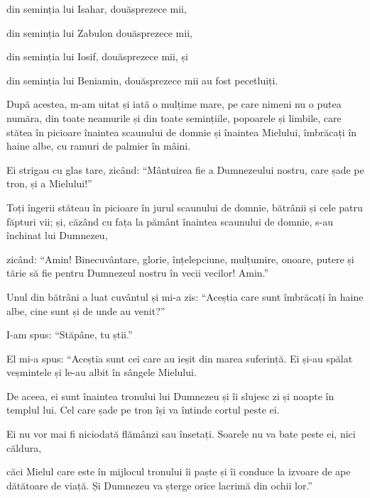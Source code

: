 {\par }{\Q din seminția lui Isahar, douăsprezece mii,


\par }{\Q {}din seminția lui Zabulon douăsprezece mii,

\par }{\Q din seminția lui Iosif, douăsprezece mii, și

\par }{\Q din seminția lui Beniamin, douăsprezece mii au fost pecetluiți.


\par }{\PP {}După acestea, m-am uitat și iată o mulțime mare, pe care nimeni nu o putea număra, din toate neamurile și din toate semințiile, popoarele și limbile, care stătea în picioare înaintea scaunului de domnie și înaintea Mielului, îmbrăcați în haine albe, cu ramuri de palmier în mâini.

Ei strigau cu glas tare, zicând: “Mântuirea fie a Dumnezeului nostru, care șade pe tron, și a Mielului!”


\par }{\PP {}Toți îngerii stăteau în picioare în jurul scaunului de domnie, bătrânii și cele patru făpturi vii; și, căzând cu fața la pământ înaintea scaunului de domnie, s-au închinat lui Dumnezeu,

zicând: “Amin! Binecuvântare, glorie, înțelepciune, mulțumire, onoare, putere și tărie să fie pentru Dumnezeul nostru în vecii vecilor! Amin.”


\par }{\PP {}Unul din bătrâni a luat cuvântul și mi-a zis: “Aceștia care sunt îmbrăcați în haine albe, cine sunt și de unde au venit?”


\par }{\PP {}I-am spus: “Stăpâne, tu știi.”

\par }{\PP El mi-a spus: “Aceștia sunt cei care au ieșit din marea suferință. Ei și-au spălat veșmintele și le-au albit în sângele Mielului.

De aceea, ei sunt înaintea tronului lui Dumnezeu și îi slujesc zi și noapte în templul lui. Cel care șade pe tron își va întinde cortul peste ei.

Ei nu vor mai fi niciodată flămânzi sau însetați. Soarele nu va bate peste ei, nici căldura,

căci Mielul care este în mijlocul tronului îi paște și îi conduce la izvoare de ape dătătoare de viață. Și Dumnezeu va șterge orice lacrimă din ochii lor.”



}
